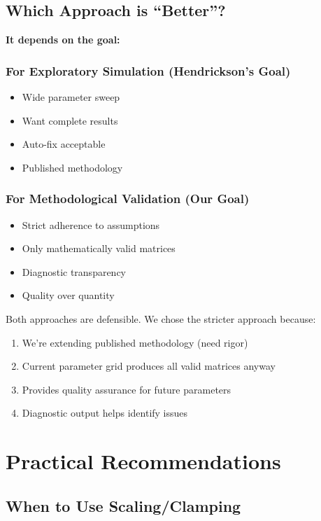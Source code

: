\documentclass[11pt]{article}
\begin{document}
\subsection{Which Approach is ``Better''?}

\textbf{It depends on the goal:}

\subsubsection{For Exploratory Simulation (Hendrickson's Goal)}
\begin{itemize}
    \item Wide parameter sweep
    \item Want complete results
    \item Auto-fix acceptable
    \item Published methodology
\end{itemize}

\subsubsection{For Methodological Validation (Our Goal)}
\begin{itemize}
    \item Strict adherence to assumptions
    \item Only mathematically valid matrices
    \item Diagnostic transparency
    \item Quality over quantity
\end{itemize}

Both approaches are defensible. We chose the stricter approach because:
\begin{enumerate}
    \item We're extending published methodology (need rigor)
    \item Current parameter grid produces all valid matrices anyway
    \item Provides quality assurance for future parameters
    \item Diagnostic output helps identify issues
\end{enumerate}

\section{Practical Recommendations}

\subsection{When to Use Scaling/Clamping}
\end{document}
